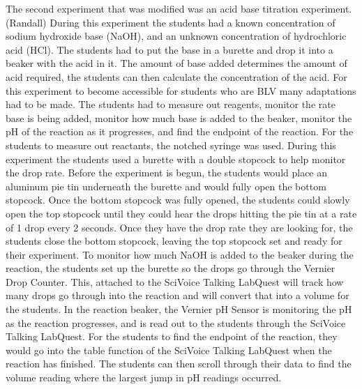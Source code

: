 \documentclass[11.5pt]{sig-alternate} %
\begin{document}
\begin{large}
The second experiment that was modified was an acid base titration experiment. (Randall) During this experiment the students had a known concentration of sodium hydroxide base (NaOH), and an unknown concentration of hydrochloric acid (HCl). The students had to put the base in a burette and drop it into a beaker with the acid in it. The amount of base added determines the amount of acid required, the students can then calculate the concentration of the acid. For this experiment to become accessible for students who are BLV many adaptations had to be made. The students had to measure out reagents, monitor the rate base is being added, monitor how much base is added to the beaker, monitor the pH of the reaction as it progresses, and find the endpoint of the reaction. For the students to measure out reactants, the notched syringe was used. During this experiment the students used a burette with a double stopcock to help monitor the drop rate. Before the experiment is begun, the students would place an aluminum pie tin underneath the burette and would fully open the bottom stopcock. Once the bottom stopcock was fully opened, the students could slowly open the top stopcock until they could hear the drops hitting the pie tin at a rate of 1 drop every 2 seconds. Once they have the drop rate they are looking for, the students close the bottom stopcock, leaving the top stopcock set and ready for their experiment. To monitor how much NaOH is added to the beaker during the reaction, the students set up the burette so the drops go through the Vernier Drop Counter. This, attached to the SciVoice Talking LabQuest will track how many drops go through into the reaction and will convert that into a volume for the students. In the reaction beaker, the Vernier pH Sensor is monitoring the pH as the reaction progresses, and is read out to the students through the SciVoice Talking LabQuest. For the students to find the endpoint of the reaction, they would go into the table function of the SciVoice Talking LabQuest when the reaction has finished. The students can then scroll through their data to find the volume reading where the largest jump in pH readings occurred. 


\end{large}
\end{document}
